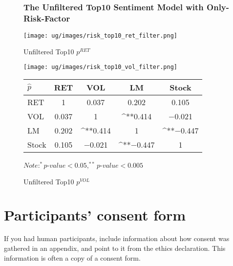 \documentclass[logo,bsc,singlespacing,parskip]{infthesis}
\begin{document}
\begin{figure}[ht]
\subsection{The Unfiltered Top10 Sentiment Model with Only-Risk-Factor}
\label{appendix_risk_top10}
\begin{minipage}{0.90\textwidth}
  \centering
  \begin{minipage}{0.5\textwidth}
    \centering
    \texttt{[image: ug/images/risk\_top10\_ret\_filter.png]}
    \caption{\small Unfiltered Top10 ${p}^{RET}$}
    \label{fig:risk_top10_ret_unfiltered}
  \end{minipage}%
  \begin{minipage}{0.5\textwidth}
    \centering
    \texttt{[image: ug/images/risk\_top10\_vol\_filter.png]} 
    \caption{\small Unfiltered Top10 ${p}^{VOL}$}
    \label{fig:risk_top10_vol_unfiltered}
  \end{minipage}


    \begin{minipage}[t]{0.9\textwidth}
    \centering
    \begin{tabular}{lcccc}
    \label{tab:risk_top10_corr_unfiltered}
    $\hat{p}$      & RET       & VOL       & LM        & Stock    \\ \hline
    RET    & 1  & 0.037  & 0.202 &  0.105 \\
    VOL    & 0.037   & 1  & ^{**}0.414 & $-$0.021  \\
    LM    & 0.202 & ^{**}0.414 & 1  & ^{**}$-$0.447 \\
    Stock  &  0.105 & $-$0.021  & ^{**}$-$0.447 & 1  \\ \hline
    \end{tabular}
    \medskip
    $\textit{Note}: ^{*}p$-$value<0.05, ^{**}p$-$value<0.005$
    \end{minipage}

\end{minipage}
\end{figure}

\chapter{Participants' consent form}

If you had human participants, include information about how consent was
gathered in an appendix, and point to it from the ethics declaration.
This information is often a copy of a consent form.
\end{document}
